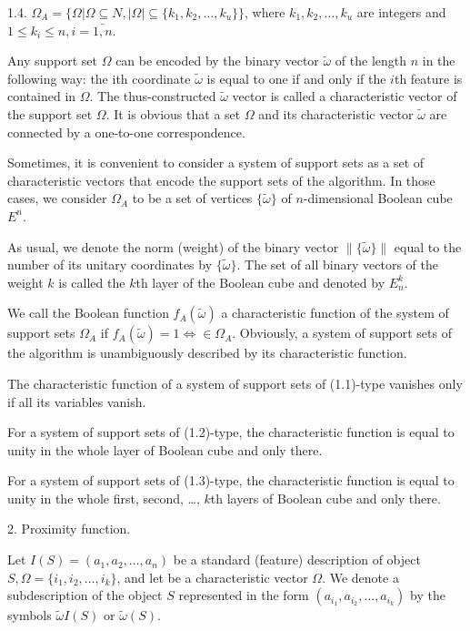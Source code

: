 1.4. $\Omega_A=\{\Omega|\Omega\subseteq N,|\Omega|\subseteq \{k_1,k_2,\ldots,k_u\}\}$, where 
$k_1,k_2,\ldots,k_u$  are integers and $1\leq k_i \leq n, i=\bar{1,n}$. 

Any support set $\Omega$ 
can be encoded by the binary vector $\tilde{\omega}$ of the length $n$ in the following way: 
the ith coordinate $\tilde{\omega}$ is equal to one if and only if the $i$th feature is contained 
in $\Omega$. The thus-constructed $\tilde{\omega}$ vector is called a characteristic vector 
of the support set $\Omega$. It is obvious that a set $\Omega$ and its characteristic 
vector $\tilde{\omega}$ are connected by a one-to-one correspondence.

Sometimes, it is convenient to consider a system of support sets as a set of characteristic 
vectors that encode the support sets of the algorithm. In those cases, we consider $\Omega_A$ 
to be a set of vertices $\{\tilde{\omega}\}$ of $n$-dimensional Boolean cube $E^n$. 

As usual, we denote the norm (weight) of the binary vector $\|\{\tilde{\omega}\}\|$ equal to 
the number of its unitary coordinates by $\{\tilde{\omega}\}$. The set of all binary vectors 
of the weight $k$ is called the $k$th layer of the Boolean cube and denoted by $E_n^k$.

We call the Boolean function $f_A(\tilde{\omega})$ a characteristic function of the system of support 
sets $\Omega_A$ if $f_A(\tilde{\omega})=1\Leftrightarrow \in \Omega_A$. Obviously, a system of support 
sets of the algorithm is unambiguously described by its characteristic function. 

The characteristic function of a system of support sets of (1.1)-type vanishes only if all its 
variables vanish.

For a system of support sets of (1.2)-type, the characteristic function is 
equal to unity in the whole layer of Boolean cube and only there.

For a system of support sets of (1.3)-type, the characteristic function is equal to 
unity in the whole first, second, \ldots, $k$th layers of Boolean cube and only there.   

2. Proximity function.

Let $I(S) = (a_1, a_2, \ldots, a_n)$ be a standard (feature) description of 
object $S, \Omega = \{i_1, i_2,\ldots, i_k\}$, and let  be a characteristic 
vector $\Omega$. We denote a subdescription of the object $S$ represented in 
the form $(a_{i_1}, a_{i_2} ,\ldots,a_{i_k})$ by the symbols 
$\tilde{\omega} I(S)$ or $\tilde{\omega}(S)$.

